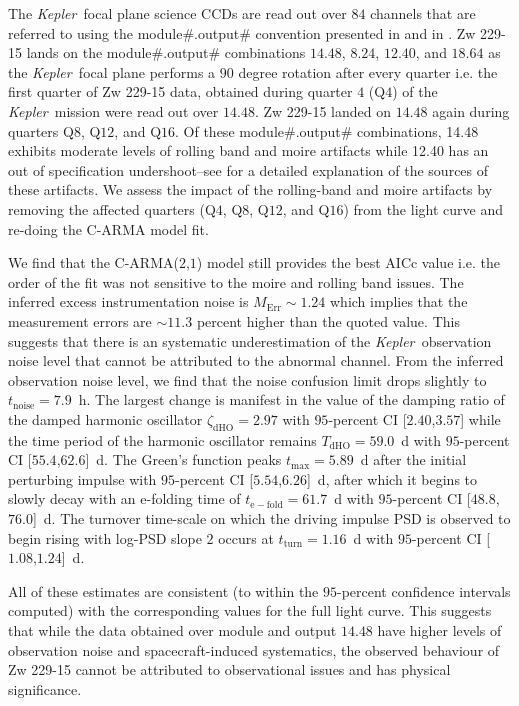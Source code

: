 \documentclass[a4paper,fleqn,usenatbib]{mnras}
\newcommand{\Kepler}{\textit{Kepler~}}
\begin{document}
The \Kepler focal plane science CCDs are read out over $84$ channels that are referred to using the module\#.output\# convention presented in \citet{KIH} and in \citet{Kasliwal15}. Zw 229-15 lands on the module\#.output\# combinations $14$.$48$, $8$.$24$, $12$.$40$, and $18$.$64$ as the \Kepler focal plane performs a $90$ degree rotation after every quarter i.e. the first quarter of Zw 229-15 data, obtained during quarter $4$ (Q$4$) of the \Kepler mission were read out over $14$.$48$. Zw 229-15 landed on $14$.$48$ again during quarters Q$8$, Q$12$, and Q$16$. Of these module\#.output\# combinations, 14.48 exhibits moderate levels of rolling band and moire artifacts while 12.40 has an out of specification undershoot--see \citet{KIH} for a detailed explanation of the sources of these artifacts. We assess the impact of the rolling-band and moire artifacts by removing the affected quarters (Q$4$, Q$8$, Q$12$, and Q$16$) from the light curve and re-doing the C-ARMA model fit.

We find that the C-ARMA($2$,$1$) model still provides the best AICc value i.e. the order of the fit was not sensitive to the moire and rolling band issues. The inferred excess instrumentation noise is $M_{\mathrm{Err}} \sim 1.24$ which implies that the measurement errors are $\sim 11.3$ percent higher than the quoted value. This suggests that there is an systematic underestimation of the \Kepler observation noise level that cannot be attributed to the abnormal channel. From the inferred observation noise level, we find that the noise confusion limit drops slightly to $t_{\mathrm{noise}} = 7.9$~h. The largest change is manifest in the value of the damping ratio of the damped harmonic oscillator $\zeta_{\mathrm{dHO}} = 2.97$ with $95$-percent CI [$2.40$,$3.57$] while the time period of the harmonic oscillator remains $T_{\mathrm{dHO}} = 59.0$~d with $95$-percent CI [$55.4$,$62.6$]~d. The Green's function peaks $t_{\mathrm{max}} = 5.89$~d after the initial perturbing impulse with $95$-percent CI [$5.54$,$6.26$]~d, after which it begins to slowly decay with an e-folding time of $t_{\mathrm{e-fold}} = 61.7$~d with $95$-percent CI [$48.8$,$76.0$]~d. The turnover time-scale on which the driving impulse PSD is observed to begin rising with log-PSD slope $2$ occurs at $t_{\mathrm{turn}} = 1.16$~d with $95$-percent CI [$1.08$,$1.24$]~d.

All of these estimates are consistent (to within the $95$-percent confidence intervals computed) with the corresponding values for the full light curve. This suggests that while the data obtained over module and output $14$.$48$ have higher levels of observation noise and spacecraft-induced systematics, the observed behaviour of Zw 229-15 cannot be attributed to observational issues and has physical significance.
\end{document}
